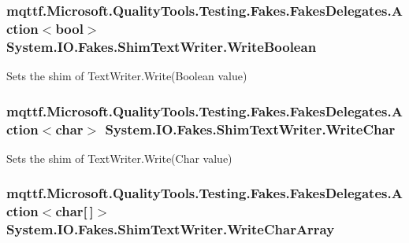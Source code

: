 \hypertarget{class_system_1_1_i_o_1_1_fakes_1_1_shim_text_writer_a9ee455a7b3bf88e3e6c828d57eeb3d9f}{
\subsubsection[{Write\-Boolean}]{\setlength{\rightskip}{0pt plus 5cm}mqttf.\-Microsoft.\-Quality\-Tools.\-Testing.\-Fakes.\-Fakes\-Delegates.\-Action$<$bool$>$ System.\-I\-O.\-Fakes.\-Shim\-Text\-Writer.\-Write\-Boolean\hspace{0.3cm}{\ttfamily [set]}}}\label{class_system_1_1_i_o_1_1_fakes_1_1_shim_text_writer_a9ee455a7b3bf88e3e6c828d57eeb3d9f}


Sets the shim of Text\-Writer.\-Write(\-Boolean value)

\hypertarget{class_system_1_1_i_o_1_1_fakes_1_1_shim_text_writer_acf1707abc1848d8a4149cc77401931a7}{
\subsubsection[{Write\-Char}]{\setlength{\rightskip}{0pt plus 5cm}mqttf.\-Microsoft.\-Quality\-Tools.\-Testing.\-Fakes.\-Fakes\-Delegates.\-Action$<$char$>$ System.\-I\-O.\-Fakes.\-Shim\-Text\-Writer.\-Write\-Char\hspace{0.3cm}{\ttfamily [set]}}}\label{class_system_1_1_i_o_1_1_fakes_1_1_shim_text_writer_acf1707abc1848d8a4149cc77401931a7}


Sets the shim of Text\-Writer.\-Write(\-Char value)

\hypertarget{class_system_1_1_i_o_1_1_fakes_1_1_shim_text_writer_a84067851e837c06cc90392f4e7ede5e6}{
\subsubsection[{Write\-Char\-Array}]{\setlength{\rightskip}{0pt plus 5cm}mqttf.\-Microsoft.\-Quality\-Tools.\-Testing.\-Fakes.\-Fakes\-Delegates.\-Action$<$char\mbox{[}$\,$\mbox{]}$>$ System.\-I\-O.\-Fakes.\-Shim\-Text\-Writer.\-Write\-Char\-Array\hspace{0.3cm}{\ttfamily [set]}}}\label{class_system_1_1_i_o_1_1_fakes_1_1_shim_text_writer_a84067851e837c06cc90392f4e7ede5e6}


